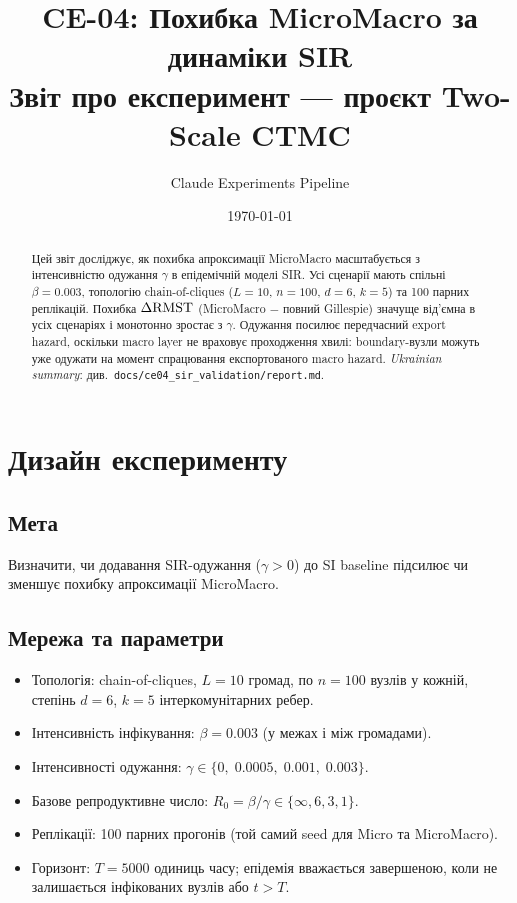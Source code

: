 \documentclass[11pt,a4paper]{article}
\title{CE-04: Похибка MicroMacro за динаміки SIR\\
       \large Звіт про експеримент --- проєкт Two-Scale CTMC}
\author{Claude Experiments Pipeline}
\date{\today}
\begin{document}
\maketitle

\begin{abstract}
Цей звіт досліджує, як похибка апроксимації MicroMacro масштабується з
інтенсивністю одужання $\gamma$ в епідемічній моделі SIR.
Усі сценарії мають спільні $\beta = 0.003$, топологію chain-of-cliques
($L=10$, $n=100$, $d=6$, $k=5$) та 100 парних реплікацій.
Похибка $\Delta\mathrm{RMST}$ (MicroMacro $-$ повний Gillespie) значуще від'ємна
в усіх сценаріях і монотонно зростає з $\gamma$.
Одужання посилює передчасний export hazard, оскільки macro layer
не враховує проходження хвилі: boundary-вузли можуть уже
одужати на момент спрацювання експортованого macro hazard.
\textit{Ukrainian summary}: див.\ \texttt{docs/ce04\_sir\_validation/report.md}.
\end{abstract}

\section{Дизайн експерименту}

\subsection{Мета}
Визначити, чи додавання SIR-одужання ($\gamma > 0$) до SI baseline
підсилює чи зменшує похибку апроксимації MicroMacro.

\subsection{Мережа та параметри}
\begin{itemize}
  \item Топологія: chain-of-cliques, $L=10$ громад, по $n=100$ вузлів у кожній,
        степінь $d=6$, $k=5$ інтеркомунітарних ребер.
  \item Інтенсивність інфікування: $\beta = 0.003$ (у межах і між громадами).
  \item Інтенсивності одужання: $\gamma \in \{0,\; 0.0005,\; 0.001,\; 0.003\}$.
  \item Базове репродуктивне число: $R_0 = \beta/\gamma \in \{\infty, 6, 3, 1\}$.
  \item Реплікації: 100 парних прогонів (той самий seed для Micro та MicroMacro).
  \item Горизонт: $T = 5000$ одиниць часу; епідемія вважається завершеною,
        коли не залишається інфікованих вузлів або $t > T$.
\end{itemize}
\end{document}
